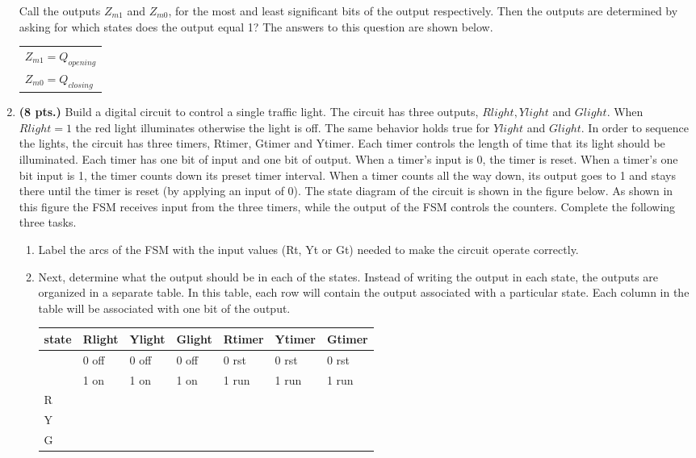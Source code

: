 \begin{enumerate}
\begin{onlysolution}
{Call the outputs $Z_{m1}$ and $Z_{m0}$, for the most and least
significant bits of the output respectively.  Then the outputs
are determined by asking for which states does the output
equal 1?  The answers to this question are shown below.

\begin{tabular}{l}
$Z_{m1} = Q_{opening}$ \\
$Z_{m0} = Q_{closing}$ \\
\end{tabular}

}\end{onlysolution} 


\item \textbf{ (8 pts.)}
Build a digital circuit to control a single traffic light.  The circuit
has three outputs, $Rlight, Ylight$ and $ Glight$.  When
$Rlight=1$ the red light illuminates otherwise the light is off.
The same behavior holds true for $Ylight$ and $Glight$.  In order
to sequence the lights, the circuit has three timers, Rtimer, Gtimer and 
Ytimer.  Each timer controls the length of time that its light should be 
illuminated.  Each timer has one bit of input and one bit of output.  When a 
timer's input is 0, the timer is reset.  When a timer's one bit
input is 1, the timer 
counts down its preset timer interval.  When a timer counts all the way down,
its output goes to 1 and stays there until the timer is reset (by applying
an input of 0).  The state diagram of the circuit is shown in the
figure below.  As shown in this figure the FSM receives input from the 
three timers, while the output of the FSM controls the counters. Complete
the following three tasks.


\begin{enumerate}
\item Label the arcs of the FSM with the input values (Rt, Yt or Gt)
needed to make the circuit operate correctly.  

\item Next, determine what the output should be in each
of the states.  Instead of writing the output in each state, the
outputs are organized in a separate table.  In this table, each
row will contain the output associated with a particular state.
Each column in the table will be associated with one bit of the output.

\begin{tabular}{l||l|l|l|l|l|l}
state	& Rlight & Ylight & Glight & Rtimer & Ytimer & Gtimer	\\ \hline 
    & 0 off  & 0 off  & 0 off  & 0 rst  & 0 rst  & 0 rst	\\ \hline
    & 1 on   & 1 on   & 1 on   & 1 run  & 1 run  & 1 run	\\ \hline \hline
R	&	 &	  &	   &	    &	     &		\\ \hline
Y	&	 &	  &	   &	    &	     &		\\ \hline
G	&	 &	  &	   &	    &	     &		\\ 
\end{tabular}


\end{enumerate}
\end{enumerate}
